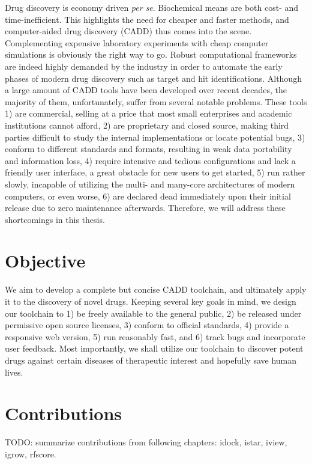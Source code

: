 Drug discovery is economy driven \textit{per se}. Biochemical means are both cost- and time-inefficient. This highlights the need for cheaper and faster methods, and computer-aided drug discovery (CADD) thus comes into the scene. Complementing expensive laboratory experiments with cheap computer simulations is obviously the right way to go. Robust computational frameworks are indeed highly demanded by the industry in order to automate the early phases of modern drug discovery such as target and hit identifications. Although a large amount of CADD tools have been developed over recent decades, the majority of them, unfortunately, suffer from several notable problems. These tools 1) are commercial, selling at a price that most small enterprises and academic institutions cannot afford, 2) are proprietary and closed source, making third parties difficult to study the internal implementations or locate potential bugs, 3) conform to different standards and formats, resulting in weak data portability and information loss, 4) require intensive and tedious configurations and lack a friendly user interface, a great obstacle for new users to get started, 5) run rather slowly, incapable of utilizing the multi- and many-core architectures of modern computers, or even worse, 6) are declared dead immediately upon their initial release due to zero maintenance afterwards. Therefore, we will address these shortcomings in this thesis.

\section{Objective}

We aim to develop a complete but concise CADD toolchain, and ultimately apply it to the discovery of novel drugs. Keeping several key goals in mind, we design our toolchain to 1) be freely available to the general public, 2) be released under permissive open source licenses, 3) conform to official standards, 4) provide a responsive web version, 5) run reasonably fast, and 6) track bugs and incorporate user feedback. Most importantly, we shall utilize our toolchain to discover potent drugs against certain diseases of therapeutic interest and hopefully save human lives.

\section{Contributions}

TODO: summarize contributions from following chapters: idock, istar, iview, igrow, rfscore.


